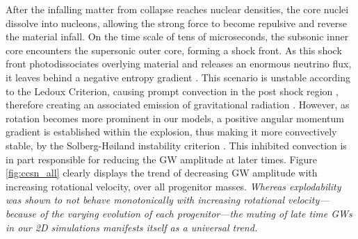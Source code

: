 \documentclass[twocolumn,times]{aastex62}  %
\begin{document}
 After the infalling matter from collapse reaches nuclear densities, the core nuclei dissolve into nucleons, allowing the strong force to become repulsive and reverse the material infall.  On the time scale of tens of microseconds, the subsonic inner core encounters the supersonic outer core, forming a shock front.  As this shock front photodissociates overlying material and releases an enormous neutrino flux, it leaves behind a negative entropy gradient \citep{mazurek:1982,bruenn:1985,bruenn:1989}.  This scenario is unstable according to the Ledoux Criterion, causing prompt convection in the post shock region \citep{burrows:1992} , therefore creating an associated emission of gravitational radiation \citep{marek:2009b,ott:2009}.  However, as rotation becomes more prominent in our models, a positive angular momentum gradient is established within the explosion, thus making it more convectively stable, by the Solberg-H{\o}iland instability criterion \citep{endal:1978,fryer:2000}.  This inhibited convection is in part responsible for reducing the GW amplitude at later times.  Figure \ref{fig:ccsn_all} clearly displays the trend of decreasing GW amplitude with increasing rotational velocity, over all progenitor masses.  \textit{Whereas explodability was shown to not behave monotonically with increasing rotational velocity---because of the varying evolution of each progenitor---the muting of late time GWs in our 2D simulations manifests itself as a universal trend.}  
 
\end{document}
